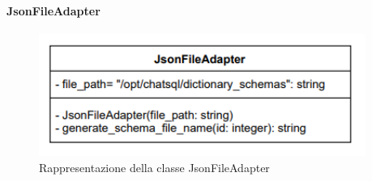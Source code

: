 \paragraph{JsonFileAdapter} \label{JsonFileAdapter}
\begin{figure}[H]
    \centering
    \includegraphics[width=0.95\textwidth]{assets/Backend/json_file_adapter.png}
    \caption{Rappresentazione della classe JsonFileAdapter}
  \end{figure}
